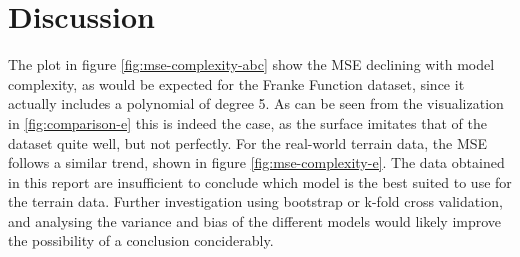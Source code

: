 \section{Discussion}
The plot in figure \ref{fig:mse-complexity-abc} show the MSE declining with model complexity,
as would be expected for the Franke Function dataset, since it actually includes a polynomial
of degree 5.
As can be seen from the visualization in \ref{fig:comparison-e} this is indeed the case,
as the surface imitates that of the dataset quite well, but not perfectly.
For the real-world terrain data, the MSE follows a similar trend, shown in
figure \ref{fig:mse-complexity-e}.
The data obtained in this report are insufficient to conclude which model is the best suited
to use for the terrain data. Further investigation using bootstrap or k-fold cross validation,
and analysing the variance and bias of the different models would likely improve the possibility
of a conclusion conciderably.




